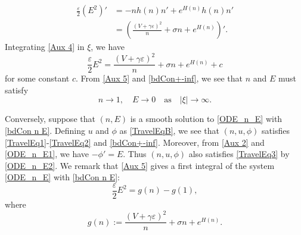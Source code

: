 \documentclass{amsart}
\newcommand{\veps}{\varepsilon}
\numberwithin{equation}{section}
\theoremstyle{plain}%
\theoremstyle{definition}
\theoremstyle{remark}
\theoremstyle{remark}
\begin{document}
\begin{equation}\label{Aux 4}
\begin{split}
\frac{\veps}{2}\left(E^2\right)'
& = -nh(n) n' + e^{H(n)}h(n) n' \\
& = \left( \frac{(V+\gamma\veps)^2}{n} + \sigma n + e^{H(n)}\right)'.
\end{split}
\end{equation}
Integrating \eqref{Aux 4} in $\xi$, we have 
\begin{equation}\label{Aux 5}
\frac{\veps}{2} E^2 =  \frac{(V+\gamma\veps)^2}{n} + \sigma n + e^{H(n)} + c
\end{equation}
for some constant $c$. From \eqref{Aux 5} and \eqref{bdCon+-inf}, we see that $n$ and $E$ must satisfy
\begin{equation}\label{bdCon n E}
n \to 1, \quad  E \to 0 \quad \text{as}\quad  |\xi| \to \infty.
\end{equation}

Conversely, suppose that $(n,E)$ is a smooth solution to \eqref{ODE_n_E} with \eqref{bdCon n E}. Defining $u$ and $\phi$ as \eqref{TravelEqB}, we see that $(n,u,\phi)$ satisfies \eqref{TravelEq1}-\eqref{TravelEq2} and \eqref{bdCon+-inf}. Moreover, from \eqref{Aux 2} and \eqref{ODE_n_E1}, we have $-\phi'=E$. Thus $(n,u,\phi)$ also satisfies \eqref{TravelEq3} by \eqref{ODE_n_E2}. We remark that \eqref{Aux 5} gives a first integral of the system \eqref{ODE_n_E} with \eqref{bdCon n E}:
\begin{equation}\label{1st Int}
\frac{\veps}{2}E^2 = g(n) -g(1),
\end{equation}
where
\begin{equation}\label{Def_g}
g(n):=  \frac{(V+\gamma\veps)^2}{n} + \sigma n + e^{H(n)}.
\end{equation}
\end{document}
